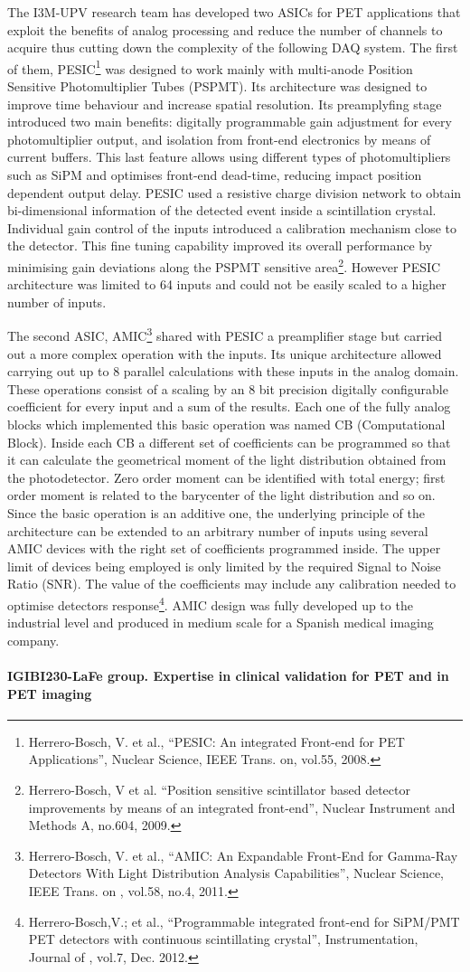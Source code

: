 The I3M-UPV research team has developed two ASICs for PET applications that
exploit the benefits of analog processing and reduce the number of channels
to acquire thus cutting down the complexity of the following DAQ system. 
The first of them, PESIC\footnote{Herrero-Bosch, V. et al., 
``PESIC: An integrated Front-end for PET
Applications'', Nuclear Science, IEEE Trans. on, vol.55, 2008.} was designed to work mainly with multi-anode
Position Sensitive Photomultiplier Tubes (PSPMT). Its architecture was
designed to improve time behaviour and increase spatial resolution. Its
preamplyfing stage introduced two main benefits: digitally programmable gain
adjustment for every photomultiplier output, and isolation from front-end
electronics by means of current buffers. This last feature allows using
different types of photomultipliers such as SiPM and optimises front-end
dead-time, reducing impact position dependent output delay. PESIC used a
resistive charge division network to obtain bi-dimensional information of the
detected event inside a scintillation crystal.  Individual gain control of
the inputs introduced a calibration mechanism close to the detector. This
fine tuning capability improved its overall performance by minimising gain
deviations along the PSPMT sensitive area\footnote{Herrero-Bosch, V et al. ``Position sensitive scintillator based detector
improvements by means of an integrated front-end'', Nuclear Instrument and Methods
A, no.604, 2009.}. However PESIC architecture
was limited to 64 inputs and could not be easily scaled to a higher number
of inputs.

The second ASIC, AMIC\footnote{Herrero-Bosch, V. et al., ``AMIC: An Expandable Front-End for Gamma-Ray
Detectors With Light Distribution Analysis Capabilities'', Nuclear Science,
IEEE Trans. on , vol.58, no.4, 2011.} shared with PESIC a preamplifier stage but carried
out a more complex operation with the inputs. Its unique architecture
allowed carrying out up to 8 parallel calculations with these inputs in the
analog domain. These operations consist of a scaling by an 8 bit precision
digitally configurable coefficient for every input and a sum of the results.
Each one of the fully analog blocks which implemented this basic operation
was named CB (Computational Block). Inside each CB a different set of
coefficients can be programmed so that it can calculate the geometrical
moment of the light distribution obtained from the photodetector. Zero order
moment can be identified with total energy; first order moment is related to
the barycenter of the light distribution and so on. Since the basic
operation is an additive one, the underlying principle of the architecture
can be extended to an arbitrary number of inputs using several AMIC devices
with the right set of coefficients programmed inside. The upper limit of
devices being employed is only limited by the required Signal to Noise Ratio
(SNR). The value of the coefficients may include any calibration needed to
optimise detectors response\footnote{Herrero-Bosch,V.; et al., ``Programmable integrated front-end for
SiPM/PMT PET detectors with continuous scintillating crystal'',
Instrumentation, Journal of , vol.7, Dec. 2012.}. AMIC design was fully developed up to the
industrial level and produced in medium scale for a Spanish medical imaging
company.

\paragraph{IGIBI230-LaFe group. Expertise in clinical validation for PET and in PET imaging}